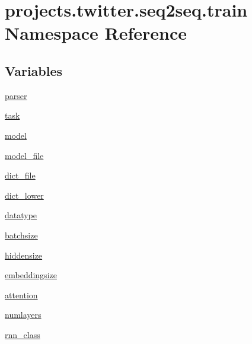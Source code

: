 \hypertarget{namespaceprojects_1_1twitter_1_1seq2seq_1_1train}{}\section{projects.\+twitter.\+seq2seq.\+train Namespace Reference}
\label{namespaceprojects_1_1twitter_1_1seq2seq_1_1train}
\subsection*{Variables}
\begin{DoxyCompactItemize}
\item 
\hyperlink{namespaceprojects_1_1twitter_1_1seq2seq_1_1train_a9e6a15f047bea69a82a938079cc0ba2f}{parser}
\item 
\hyperlink{namespaceprojects_1_1twitter_1_1seq2seq_1_1train_a51cfbd999af26b059b5d5442c984be9b}{task}
\item 
\hyperlink{namespaceprojects_1_1twitter_1_1seq2seq_1_1train_a86896423f4d94c6bdd91ebced377ccec}{model}
\item 
\hyperlink{namespaceprojects_1_1twitter_1_1seq2seq_1_1train_a8bcf78f30268b40edf0e6df44b476a75}{model\+\_\+file}
\item 
\hyperlink{namespaceprojects_1_1twitter_1_1seq2seq_1_1train_ab00b37ad91423948f2d9bf2839b64316}{dict\+\_\+file}
\item 
\hyperlink{namespaceprojects_1_1twitter_1_1seq2seq_1_1train_ab2c85632a2a318851b9f675efc1ab4c3}{dict\+\_\+lower}
\item 
\hyperlink{namespaceprojects_1_1twitter_1_1seq2seq_1_1train_a9acdb1312a3787bcfb1e854c557fcaff}{datatype}
\item 
\hyperlink{namespaceprojects_1_1twitter_1_1seq2seq_1_1train_a80c8112773ded56fe439a3d97a3e790a}{batchsize}
\item 
\hyperlink{namespaceprojects_1_1twitter_1_1seq2seq_1_1train_a43dbbfc725c938ac40bbde95e0f85d5d}{hiddensize}
\item 
\hyperlink{namespaceprojects_1_1twitter_1_1seq2seq_1_1train_a069e63e4319bbbf8f442f20f21760c7e}{embeddingsize}
\item 
\hyperlink{namespaceprojects_1_1twitter_1_1seq2seq_1_1train_a51af6c3f45d7c28e7e90ece16206a11e}{attention}
\item 
\hyperlink{namespaceprojects_1_1twitter_1_1seq2seq_1_1train_a241b3896bf57f7eede097ac41f4e3b82}{numlayers}
\item 
\hyperlink{namespaceprojects_1_1twitter_1_1seq2seq_1_1train_ad02b8811b08973f6bf13280c07bb43fe}{rnn\+\_\+class}

\end{DoxyCompactItemize}
